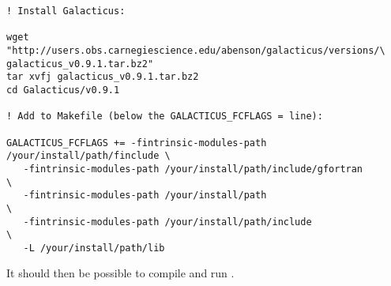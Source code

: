 \begin{lstlisting}[language=simple,stringstyle=\ttfamily,commentstyle=\itshape]
! Install Galacticus:

wget "http://users.obs.carnegiescience.edu/abenson/galacticus/versions/\
galacticus_v0.9.1.tar.bz2"
tar xvfj galacticus_v0.9.1.tar.bz2
cd Galacticus/v0.9.1

! Add to Makefile (below the GALACTICUS_FCFLAGS = line):

GALACTICUS_FCFLAGS += -fintrinsic-modules-path /your/install/path/finclude \
   -fintrinsic-modules-path /your/install/path/include/gfortran            \
   -fintrinsic-modules-path /your/install/path                             \
   -fintrinsic-modules-path /your/install/path/include                     \
   -L /your/install/path/lib
\end{lstlisting}

It should then be possible to compile and run \glc.

